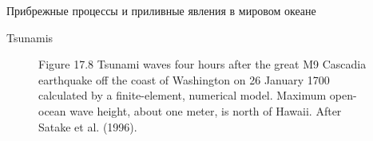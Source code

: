 \begin{chapter}{Прибрежные процессы и приливные явления в мировом океане}
\begin{section}{Tsunamis}
\begin{figure}[t!]
\caption{Figure 17.8 Tsunami waves four
hours after the great M9 Cascadia earthquake off the coast of
Washington on 26 January 1700 calculated by a finite-element,
numerical model. Maximum open-ocean wave height, about one meter, is
north of Hawaii. After Satake et al. (1996).}
\label{fig:tsunamiwave}
\end{figure}
%
%


\end{section}
\end{chapter}
